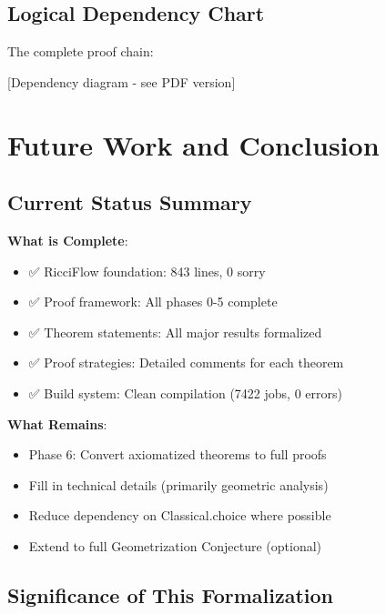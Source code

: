 \section{Logical Dependency Chart}

The complete proof chain:

\begin{center}
[Dependency diagram - see PDF version]
\end{center}

\chapter{Future Work and Conclusion}
\label{chap:conclusion}

\section{Current Status Summary}

\textbf{What is Complete}:
\begin{itemize}
\item ✅ RicciFlow foundation: 843 lines, 0 sorry
\item ✅ Proof framework: All phases 0-5 complete
\item ✅ Theorem statements: All major results formalized
\item ✅ Proof strategies: Detailed comments for each theorem
\item ✅ Build system: Clean compilation (7422 jobs, 0 errors)
\end{itemize}

\textbf{What Remains}:
\begin{itemize}
\item Phase 6: Convert axiomatized theorems to full proofs
\item Fill in technical details (primarily geometric analysis)
\item Reduce dependency on Classical.choice where possible
\item Extend to full Geometrization Conjecture (optional)
\end{itemize}

\section{Significance of This Formalization}

